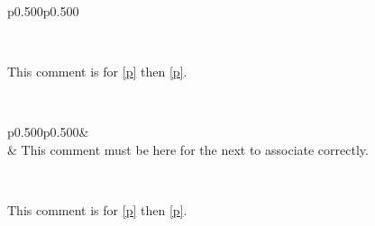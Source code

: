 {\begin{ocamltabular}{p{0.500\textwidth}p{0.500\textwidth}}
\end{ocamltabular}%
\\
\begin{ocamlindent}This comment is for \hyperref[container-page-test-module-Ocamlary-type-mutual+u+constr+u+a]{[p\pageref*{container-page-test-module-Ocamlary-type-mutual+u+constr+u+a}]} then \hyperref[container-page-test-module-Ocamlary-type-mutual+u+constr+u+b]{[p\pageref*{container-page-test-module-Ocamlary-type-mutual+u+constr+u+b}]}.\end{ocamlindent}%
\medbreak
\label{container-page-test-module-Ocamlary-type-mutual+u+constr+u+b}\\
\begin{ocamltabular}{p{0.500\textwidth}p{0.500\textwidth}}\label{container-page-test-module-Ocamlary-type-mutual+u+constr+u+b.B}& \\
\label{container-page-test-module-Ocamlary-type-mutual+u+constr+u+b.A+u+ish}& This comment must be here for the next to associate correctly.\\
\end{ocamltabular}%
\\
\begin{ocamlindent}This comment is for \hyperref[container-page-test-module-Ocamlary-type-mutual+u+constr+u+b]{[p\pageref*{container-page-test-module-Ocamlary-type-mutual+u+constr+u+b}]} then \hyperref[container-page-test-module-Ocamlary-type-mutual+u+constr+u+a]{[p\pageref*{container-page-test-module-Ocamlary-type-mutual+u+constr+u+a}]}.\end{ocamlindent}%
\medbreak
\label{container-page-test-module-Ocamlary-type-rec+u+obj}\\
}
